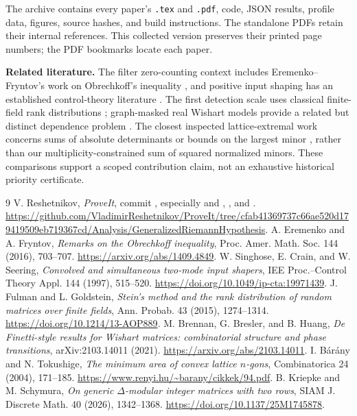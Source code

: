 \documentclass[11pt]{article}
\begin{document}
The archive contains every paper's \texttt{.tex} and \texttt{.pdf}, code,
JSON results, profile data, figures, source hashes, and build instructions.
The standalone PDFs retain their internal references. This collected
version preserves their printed page numbers; the PDF bookmarks locate
each paper.

\textbf{Related literature.}
The filter zero-counting context includes Eremenko--Fryntov's work on
Obrechkoff's inequality \cite{ef}, and positive input shaping has an
established control-theory literature \cite{input}. The first detection
scale uses classical finite-field rank distributions \cite{fg}; graph-masked
real Wishart models provide a related but distinct dependence problem
\cite{bbh}. The closest inspected lattice-extremal work concerns sums of
absolute determinants \cite{bt} or bounds on the largest minor \cite{ks},
rather than our multiplicity-constrained sum of squared normalized minors.
These comparisons support a scoped contribution claim, not an exhaustive
historical priority certificate.

\begingroup\small
\begin{thebibliography}{9}
V. Reshetnikov, \emph{ProveIt}, commit
, especially
 and ,
, and .
\url{https://github.com/VladimirReshetnikov/ProveIt/tree/cfab41369737c66ae520d179419509eb719367cd/Analysis/GeneralizedRiemannHypothesis}.
A. Eremenko and A. Fryntov, \emph{Remarks on the Obrechkoff inequality},
Proc. Amer. Math. Soc. 144 (2016), 703--707.
\url{https://arxiv.org/abs/1409.4849}.
W. Singhose, E. Crain, and W. Seering, \emph{Convolved and simultaneous
two-mode input shapers}, IEE Proc.--Control Theory Appl. 144 (1997), 515--520.
\url{https://doi.org/10.1049/ip-cta:19971439}.
J. Fulman and L. Goldstein, \emph{Stein's method and the rank distribution
of random matrices over finite fields}, Ann. Probab. 43 (2015), 1274--1314.
\url{https://doi.org/10.1214/13-AOP889}.
M. Brennan, G. Bresler, and B. Huang, \emph{De Finetti-style results for
Wishart matrices: combinatorial structure and phase transitions},
arXiv:2103.14011 (2021). \url{https://arxiv.org/abs/2103.14011}.
I. B\'ar\'any and N. Tokushige, \emph{The minimum area of convex lattice
$n$-gons}, Combinatorica 24 (2004), 171--185.
\url{https://www.renyi.hu/~barany/cikkek/94.pdf}.
B. Kriepke and M. Schymura, \emph{On generic $\Delta$-modular integer
matrices with two rows}, SIAM J. Discrete Math. 40 (2026), 1342--1368.
\url{https://doi.org/10.1137/25M1745878}.
\end{thebibliography}
\endgroup
\end{document}

